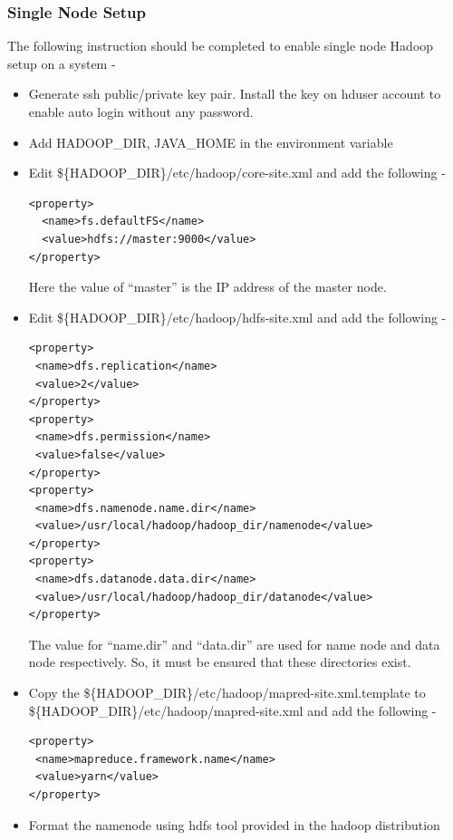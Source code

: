\documentclass{article}
\begin{document}
\subsubsection {Single Node Setup}
The following instruction should be completed to enable single node Hadoop setup on a system -
\begin{itemize}
\item Generate ssh public/private key pair. Install the key on hduser account to enable auto login without any password.
\item Add HADOOP\_DIR, JAVA\_HOME in the environment variable
\item Edit \$\{HADOOP\_DIR\}/etc/hadoop/core-site.xml and add the following -\BlankLine
\begin{lstlisting}[caption={Hadoop CoreSite Config},label={lst:coresite},style=MyXMLStyle]
<property>
  <name>fs.defaultFS</name>
  <value>hdfs://master:9000</value>
</property>
\end{lstlisting}
\BlankLine Here the value of ``master'' is the IP address of the master node.
\item Edit \$\{HADOOP\_DIR\}/etc/hadoop/hdfs-site.xml and add the following -\BlankLine
\begin{lstlisting}[caption={Hadoop HDFS Config},label={lst:hdfssite},style=MyXMLStyle]
<property>
 <name>dfs.replication</name>
 <value>2</value>
</property>
<property>
 <name>dfs.permission</name>
 <value>false</value>
</property>
<property>
 <name>dfs.namenode.name.dir</name>
 <value>/usr/local/hadoop/hadoop_dir/namenode</value>
</property>
<property>
 <name>dfs.datanode.data.dir</name>
 <value>/usr/local/hadoop/hadoop_dir/datanode</value>
</property>
\end{lstlisting}
\BlankLine The value for ``name.dir'' and ``data.dir'' are used for name node and data node respectively. So, it must be ensured that these directories exist.

\item Copy the \$\{HADOOP\_DIR\}/etc/hadoop/mapred-site.xml.template to \$\{HADOOP\_DIR\}/etc/hadoop/mapred-site.xml and add the following - \BlankLine
\begin{lstlisting}[caption={Hadoop MapRed Config},label={lst:mapredsite},style=MyXMLStyle]
<property>
 <name>mapreduce.framework.name</name>
 <value>yarn</value>
</property>
\end{lstlisting}
\item Format the namenode using hdfs tool provided in the hadoop distribution
\end{itemize}
\end{document}
